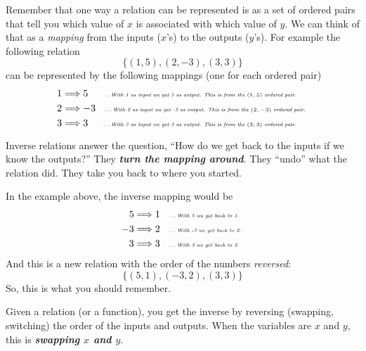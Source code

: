 \documentclass[fleqn,letterpaper,12pt,printwatermark=false]{memoir}
\begin{document}
\begin{myLesson} 
    Remember that one way a relation can be represented
    is as a set of ordered pairs that tell you
    which value of $x$ is associated with 
    which value of $y$.
    We can think of that as a \emph{mapping}
    from the inputs ($x$'s) to the outputs ($y$'s).
    For example the following relation 
    \[  
        \{ (1,5), (2,-3), (3,3) \}
    \]
    can be represented by the following mappings
    (one for each ordered pair)
    \begin{align*}
        1 &\Longrightarrow 5
        \text{
            \tiny\itshape\qquad
            \dots With 1 as input we get 5 as output.
            This is from the $(1,5)$ ordered pair.
        }\\
        2 &\Longrightarrow -3
        \text{
            \tiny\itshape\quad
            \dots With 2 as input we get -3 as output.
            This is from the $(2,-3)$ ordered pair.
        } \\
        3 &\Longrightarrow 3
        \text{
            \tiny\itshape\qquad
            \dots With 3 as input we get 3 as output.
            This is from the $(3,3)$ ordered pair.
        }
    \end{align*}

    Inverse relations answer the question, 
    ``How do we get back to the inputs if we know the outputs?''
    They {\bfseries\itshape turn the mapping around}.
    They ``undo'' what the relation did.
    They take you back to where you started.
    
    In the example above,
    the inverse mapping would be
    \begin{align*} 
        5 &\Longrightarrow 1
        \text{
            \tiny\itshape\quad
            \dots With 5 we get back to 1.
        }\\
        -3 &\Longrightarrow 2
        \text{
            \tiny\itshape\quad
            \dots With -3 we get back to 2.
        } \\
        3 &\Longrightarrow 3
        \text{
            \tiny\itshape\quad
            \dots With 3 we get back to 3.
        }
    \end{align*}
    And this is a new relation with the order of the numbers \emph{reversed}:
    \[  
        \{ (5,1), (-3,2), (3,3) \}
    \]
    So, this is what you should remember.
    \begin{myLessonBox}
        Given a relation (or a function),
        you get the inverse by reversing (swapping, switching) 
        the order of the inputs and outputs.
        When the variables are $x$ and $y$, 
        this is {\bfseries\itshape swapping $x$ and $y$}.
    \end{myLessonBox}
\end{myLesson}
\end{document}
